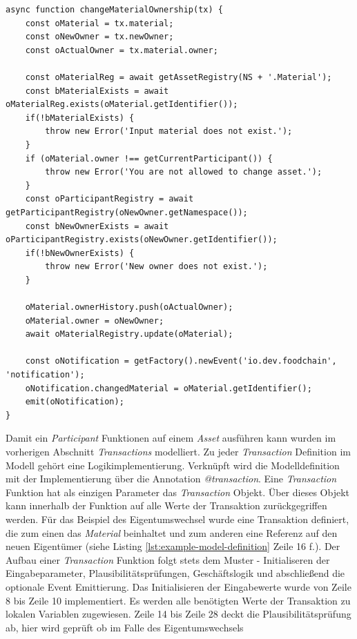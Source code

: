 \begin{lstlisting}[caption={Transaction Processor Function \textit{changeMaterialOwnership(tx)}},language=ES6,label=lst:transaction-logic-change-ownership]
async function changeMaterialOwnership(tx) {
    const oMaterial = tx.material;
    const oNewOwner = tx.newOwner;
    const oActualOwner = tx.material.owner;

    const oMaterialReg = await getAssetRegistry(NS + '.Material');
    const bMaterialExists = await oMaterialReg.exists(oMaterial.getIdentifier());
    if(!bMaterialExists) {
        throw new Error('Input material does not exist.');
    }
    if (oMaterial.owner !== getCurrentParticipant()) {
        throw new Error('You are not allowed to change asset.');
    }
    const oParticipantRegistry = await getParticipantRegistry(oNewOwner.getNamespace());
    const bNewOwnerExists = await oParticipantRegistry.exists(oNewOwner.getIdentifier());
    if(!bNewOwnerExists) {
        throw new Error('New owner does not exist.');
    }

    oMaterial.ownerHistory.push(oActualOwner);
    oMaterial.owner = oNewOwner;
    await oMaterialRegistry.update(oMaterial);

    const oNotification = getFactory().newEvent('io.dev.foodchain', 'notification');
    oNotification.changedMaterial = oMaterial.getIdentifier();
    emit(oNotification);
}
\end{lstlisting}

\noindent
Damit ein \textit{Participant} Funktionen auf einem \textit{Asset} ausführen kann wurden im vorherigen Abschnitt \textit{Transactions} modelliert. Zu jeder \textit{Transaction} Definition im Modell gehört eine Logikimplementierung. Verknüpft wird die Modelldefinition mit der Implementierung über die Annotation \textit{@transaction}. Eine \textit{Transaction} Funktion hat als einzigen Parameter das \textit{Transaction} Objekt. Über dieses Objekt kann innerhalb der Funktion auf alle Werte der Transaktion zurückgegriffen werden. Für das Beispiel des Eigentumswechsel wurde eine Transaktion definiert, die zum einen das \textit{Material} beinhaltet und zum anderen eine Referenz auf den neuen Eigentümer (siehe Listing \ref{lst:example-model-definition} Zeile 16 f.). Der Aufbau einer \textit{Transaction} Funktion folgt stets dem Muster - Initialiseren der Eingabeparameter, Plausibilitätsprüfungen, Geschäftslogik und abschließend die optionale Event Emittierung. Das Initialisieren der Eingabewerte wurde von Zeile 8 bis Zeile 10 implementiert. Es werden alle benötigten Werte der Transaktion zu lokalen Variablen zugewiesen. Zeile 14 bis Zeile 28 deckt die Plausibilitätsprüfung ab, hier wird geprüft ob im Falle des Eigentumswechsels

